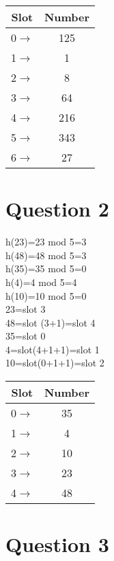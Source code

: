 \documentclass{article}
\begin{document}
\begin{center}
\begin{tabular}{c|c|}
\hline
Slot & Number\\ \hline
0$\rightarrow$ & 125\\ \hline
1$\rightarrow$ & 1\\ \hline
2$\rightarrow$ & 8\\ \hline
3$\rightarrow$ & 64\\ \hline
4$\rightarrow$ & 216\\ \hline
5$\rightarrow$ & 343\\ \hline
6$\rightarrow$ & 27\\ \hline
\end{tabular}
\end{center}



\section*{Question 2}


h(23)=23 mod 5=3\\
h(48)=48 mod 5=3\\
h(35)=35 mod 5=0\\
h(4)=4 mod 5=4\\
h(10)=10 mod 5=0\\

23=slot 3\\
48=slot (3+1)=slot 4\\
35=slot 0\\
4=slot(4+1+1)=slot 1\\
10=slot(0+1+1)=slot 2\\

\begin{center}
\begin{tabular}{c|c|}
\hline
Slot & Number\\ \hline
0$\rightarrow$ & 35\\ \hline
1$\rightarrow$ & 4\\ \hline
2$\rightarrow$ & 10\\ \hline
3$\rightarrow$ & 23\\ \hline
4$\rightarrow$ & 48\\ \hline
\end{tabular}
\end{center}



\section*{Question 3}
\end{document}
